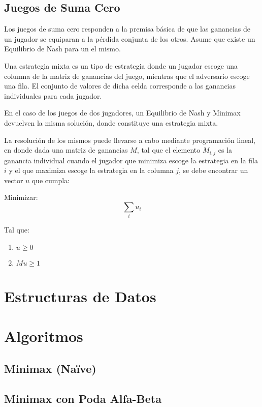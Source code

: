 \documentclass[10pt,a4paper,notitlepage,draft]{article}
\newenvironment{definition}[1][Definición]{\begin{trivlist}
\item[\hskip \labelsep {\bfseries #1}]}{\end{trivlist}}
\begin{document}
\subsection{Juegos de Suma Cero}

Los juegos de suma cero responden a la premisa básica de que las ganancias de un jugador se equiparan a la pérdida conjunta de los otros. Asume que existe un Equilibrio de Nash para un el mismo.

\begin{definition}
Una estrategia mixta es un tipo de estrategia donde un jugador escoge una columna de la matriz de ganancias del juego, mientras que el adversario escoge una fila. El conjunto de valores de dicha celda corresponde a las ganancias individuales para cada jugador.
\end{definition}

En el caso de los juegos de dos jugadores, un Equilibrio de Nash y Minimax devuelven la misma solución, donde constituye una estrategia mixta.

La resolución de los mismos puede llevarse a cabo mediante programación lineal, en donde dada una matriz de ganancias $M$, tal que el elemento $M_{i, j}$ es la ganancia individual cuando el jugador que minimiza escoge la estrategia en la fila $i$ y el que maximiza escoge la estrategia en la columna $j$, se debe encontrar un vector $u$ que cumpla:

Minimizar:
\begin{equation}
\sum_{i} u_i
\end{equation}

Tal que:
\begin{enumerate}
\item $u \geq 0$
\item $M u \geq 1$
\end{enumerate}
\cite{mic}

\section{Estructuras de Datos}
\section{Algoritmos}
\subsection{Minimax (Na\"ive)}
\subsection{Minimax con Poda Alfa-Beta}
\end{document}
